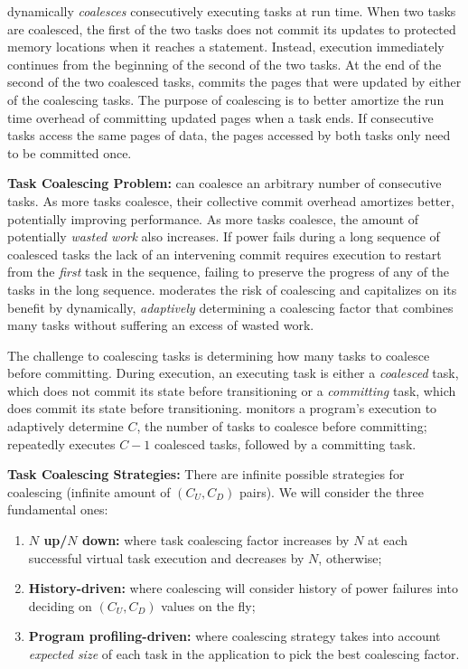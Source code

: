 \sys dynamically {\em coalesces} consecutively executing tasks at run time. When two tasks are coalesced, the first of the two tasks does not commit its updates to protected memory locations when it reaches a \transition statement. Instead, execution immediately continues from the beginning of the second of the two tasks. At the end of the second of the two coalesced tasks, \sys commits the pages that were updated by either of the coalescing tasks. The purpose of coalescing is to better amortize the run time overhead of committing updated pages when a task ends. If consecutive tasks access the same pages of data, the pages accessed by both tasks only need to be committed once.  

\textbf{Task Coalescing Problem:} \sys can coalesce an arbitrary number of consecutive tasks. As more tasks coalesce, their collective commit overhead amortizes better, potentially improving performance. As more tasks coalesce, the amount of potentially {\em wasted work} also increases. If power fails during a long sequence of coalesced tasks the lack of an intervening commit requires execution to restart from the {\em first} task in the sequence, failing to preserve the progress of any of the tasks in the long sequence. \sys moderates the risk of coalescing and capitalizes on its benefit by dynamically, \emph{adaptively} determining a coalescing factor that combines many tasks without suffering an excess of wasted work. 

The challenge to coalescing tasks is determining how many tasks to coalesce before committing. During execution, an executing task is either a {\em coalesced} task, which does not commit its state before transitioning or a {\em committing} task, which does commit its state before transitioning. \sys monitors a program's execution to adaptively determine $C$, the number of tasks to coalesce before committing; \sys repeatedly executes $C-1$ coalesced tasks,
followed by a committing task. 

\textbf{Task Coalescing Strategies:} There are infinite possible strategies for coalescing (infinite amount of $(C_U,C_D)$ pairs). We will consider the three fundamental ones:

\begin{enumerate}
	\item \textbf{$N$ up/$N$ down:} where task coalescing factor increases by $N$ at each successful virtual task execution and decreases by $N$, otherwise;
	\item \textbf{History-driven:} where coalescing will consider history of power failures into deciding on $(C_U,C_D)$ values on the fly;
	\item \textbf{Program profiling-driven:} where coalescing strategy takes into account \emph{expected size} of each task in the application to pick the best coalescing factor.
\end{enumerate}

